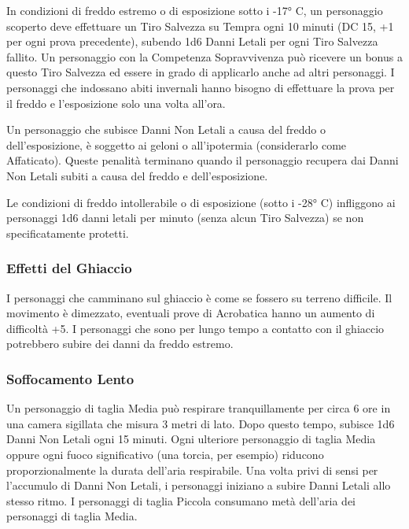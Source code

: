 \documentclass[a4paper,11pt,twoside,openany]{book}
\begin{document}
In condizioni di freddo estremo o di esposizione sotto i -17° C, un personaggio scoperto deve effettuare un Tiro Salvezza su Tempra ogni 10 minuti (DC 15, +1 per ogni prova precedente), subendo 1d6 Danni Letali per ogni Tiro Salvezza fallito. Un personaggio con la Competenza Sopravvivenza può ricevere un bonus a questo Tiro Salvezza ed essere in grado di applicarlo anche ad altri personaggi. I personaggi che indossano abiti invernali hanno bisogno di effettuare la prova per il freddo e l'esposizione solo una volta all'ora.

Un personaggio che subisce Danni Non Letali a causa del freddo o dell'esposizione, è soggetto ai geloni o all'ipotermia (considerarlo come Affaticato). Queste penalità terminano quando il personaggio recupera dai Danni Non Letali subiti a causa del freddo e dell'esposizione.

Le condizioni di freddo intollerabile o di esposizione (sotto i -28° C) infliggono ai personaggi 1d6 danni letali per minuto (senza alcun Tiro Salvezza) se non specificatamente protetti.

\subsubsection{Effetti del Ghiaccio}

I personaggi che camminano sul ghiaccio è come se fossero su terreno difficile. Il movimento è dimezzato, eventuali prove di Acrobatica hanno un aumento di difficoltà +5. I personaggi che sono per lungo tempo a contatto con il ghiaccio potrebbero subire dei danni da freddo estremo.

\subsubsection{Soffocamento Lento}

Un personaggio di taglia Media può respirare tranquillamente per circa 6 ore in una camera sigillata che misura 3 metri di lato. Dopo questo tempo, subisce 1d6 Danni Non Letali ogni 15 minuti. Ogni ulteriore personaggio di taglia Media oppure ogni fuoco significativo (una torcia, per esempio) riducono proporzionalmente la durata dell'aria respirabile. Una volta privi di sensi per l'accumulo di Danni Non Letali, i personaggi iniziano a subire Danni Letali allo stesso ritmo. I personaggi di taglia Piccola consumano metà dell'aria dei personaggi di taglia Media.

\pagebreak
\end{document}
